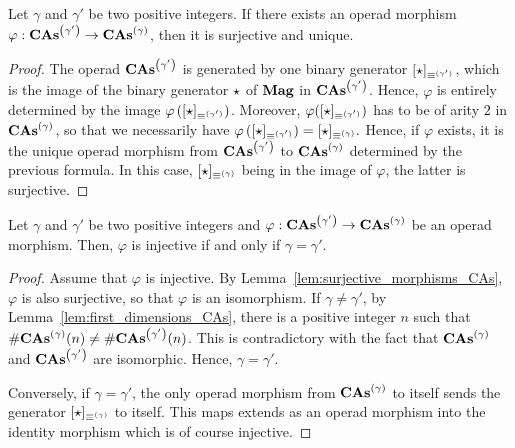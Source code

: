 \begin{Lemma} \label{lem:surjective_morphisms_CAs}
    Let $\gamma$ and $\gamma'$ be two positive integers. If there exists
    an operad morphism $\varphi:\mathbf{CAs}^{\left(\gamma'\right)} \to \mathbf{CAs}^{\left(\gamma\right)}$, then it
    is surjective and unique.
\end{Lemma}
\begin{proof}
    The operad $\mathbf{CAs}^{\left(\gamma'\right)}$ is generated by one binary generator
    $[\operatorname{\star}]_{\operatorname{\equiv}^{(\gamma')}}$, which is the image of the binary
    generator $\operatorname{\star}$ of $\mathbf{Mag}$ in $\mathbf{CAs}^{\left(\gamma'\right)}$. Hence, $\varphi$
    is entirely determined by the image
    $\varphi\left([\operatorname{\star}]_{\operatorname{\equiv}^{(\gamma')}}\right)$. Moreover,
    $\varphi([\operatorname{\star}]_{\operatorname{\equiv}^{(\gamma')}})$ has to be of arity $2$ in
    $\mathbf{CAs}^{\left(\gamma\right)}$, so that we necessarily have
    \begin{math}
        \varphi\left([\operatorname{\star}]_{\operatorname{\equiv}^{(\gamma')}}\right)
        =
        [\operatorname{\star}]_{\operatorname{\equiv}^{(\gamma)}}.
    \end{math}
    Hence, if $\varphi$ exists, it is the unique operad morphism from
    $\mathbf{CAs}^{\left(\gamma'\right)}$ to $\mathbf{CAs}^{\left(\gamma\right)}$ determined by the previous formula.
    In this case, $[\operatorname{\star}]_{\operatorname{\equiv}^{(\gamma)}}$ being in the image of
    $\varphi$, the latter is surjective.
\end{proof}
\medbreak

\begin{Lemma} \label{lem:injective_morphisms_CAs}
    Let $\gamma$ and $\gamma'$ be two positive integers and
    $\varphi:\mathbf{CAs}^{\left(\gamma'\right)} \to \mathbf{CAs}^{\left(\gamma\right)}$ be an operad morphism.
    Then, $\varphi$ is injective if and only if $\gamma = \gamma'$.
\end{Lemma}
\begin{proof}
    Assume that $\varphi$ is injective. By
    Lemma~\ref{lem:surjective_morphisms_CAs}, $\varphi$ is also
    surjective, so that $\varphi$ is an isomorphism. If
    $\gamma \ne \gamma'$, by Lemma~\ref{lem:first_dimensions_CAs}, there
    is a positive integer $n$ such that
    $\# \mathbf{CAs}^{\left(\gamma\right)}(n) \ne \# \mathbf{CAs}^{\left(\gamma'\right)}(n)$. This is contradictory
    with the fact that $\mathbf{CAs}^{\left(\gamma\right)}$ and $\mathbf{CAs}^{\left(\gamma'\right)}$ are
    isomorphic. Hence, $\gamma = \gamma'$.
    \smallbreak

    Conversely, if $\gamma = \gamma'$, the only operad morphism from
    $\mathbf{CAs}^{\left(\gamma\right)}$ to itself sends the generator
    $[\operatorname{\star}]_{\operatorname{\equiv}^{(\gamma)}}$ to itself. This maps extends as
    an operad morphism into the identity morphism which is of course
    injective.
\end{proof}
\medbreak

